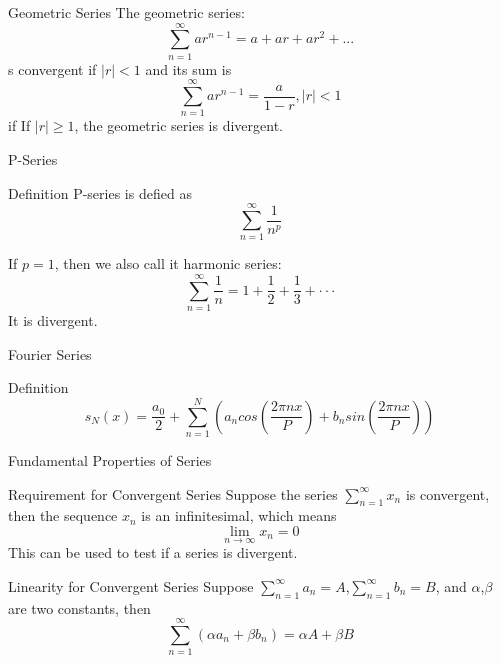 \begin{frame}{Geometric Series}
    The geometric series:\\
    $$\sum\limits_{n=1}^{\infty} ar^{n-1}=a+ar+ar^2+...$$
    s convergent if $|r| < 1$ and its sum is\\
    $$\sum\limits_{n=1}^{\infty} ar^{n-1} = \frac{a}{1-r}, |r|<1 $$
    if If $|r| \geqslant 1$, the geometric series is divergent.
\end{frame}


\begin{frame}{P-Series}
    \begin{block}{Definition}
        P-series is defied as\\
        $$\sum\limits_{n=1}^{\infty} \frac{1}{n^p}$$
    \end{block}
    If $p = 1$, then we also call it harmonic series:
    $$\sum\limits_{n=1}^{\infty}\frac{1}{n} = 1 +\frac{1}{2}+\frac{1}{3}+\cdot\cdot\cdot$$
    It is divergent.
\end{frame}



\begin{frame}{Fourier Series}
    \begin{block}{Definition}
        $$s_N(x)=\frac{a_0}{2}+\sum\limits^{N}_{n=1}(a_n cos(\frac{2\pi nx}{P})+b_n sin(\frac{2\pi nx}{P}))$$
    \end{block}
\end{frame}



\begin{frame}{Fundamental Properties of Series}
    \begin{block}{Requirement for Convergent Series}
        Suppose the series $\sum_{n=1}^{\infty} x_n$ is convergent, then the sequence $x_n$ is an infinitesimal, which means
        $$\mathop{lim} \limits_{n \rightarrow \infty} x_n = 0$$
        This can be used to test if a series is divergent.
    \end{block}
    \begin{block}{Linearity for Convergent Series}
        Suppose $\sum_{n=1}^{\infty} a_n = A$,$\sum_{n=1}^{\infty} b_n = B$, and $\alpha$,$\beta$ are two constants, then\\
        $$\sum\limits_{n=1}^{\infty}(\alpha a_n + \beta b_n)= \alpha A + \beta B$$
    \end{block}
\end{frame}




